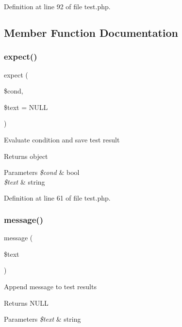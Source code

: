 Definition at line 92 of file test.\+php.



\subsection{Member Function Documentation}
\hypertarget{class_test_a82ce39187ec69f28ce3ad0b971858c32}{}\label{class_test_a82ce39187ec69f28ce3ad0b971858c32} 
\subsubsection{\texorpdfstring{expect()}{expect()}}
{\footnotesize\ttfamily expect (\begin{DoxyParamCaption}\item[{}]{\$cond,  }\item[{}]{\$text = {\ttfamily NULL} }\end{DoxyParamCaption})}

Evaluate condition and save test result \begin{DoxyReturn}{Returns}
object 
\end{DoxyReturn}

\begin{DoxyParams}{Parameters}
{\em \$cond} & bool \\
\hline
{\em \$text} & string \\
\hline
\end{DoxyParams}


Definition at line 61 of file test.\+php.

\hypertarget{class_test_a6d386dc62867e5f7426c28c22ca913c6}{}\label{class_test_a6d386dc62867e5f7426c28c22ca913c6} 
\subsubsection{\texorpdfstring{message()}{message()}}
{\footnotesize\ttfamily message (\begin{DoxyParamCaption}\item[{}]{\$text }\end{DoxyParamCaption})}

Append message to test results \begin{DoxyReturn}{Returns}
N\+U\+LL 
\end{DoxyReturn}

\begin{DoxyParams}{Parameters}
{\em \$text} & string \\
\hline
\end{DoxyParams}


